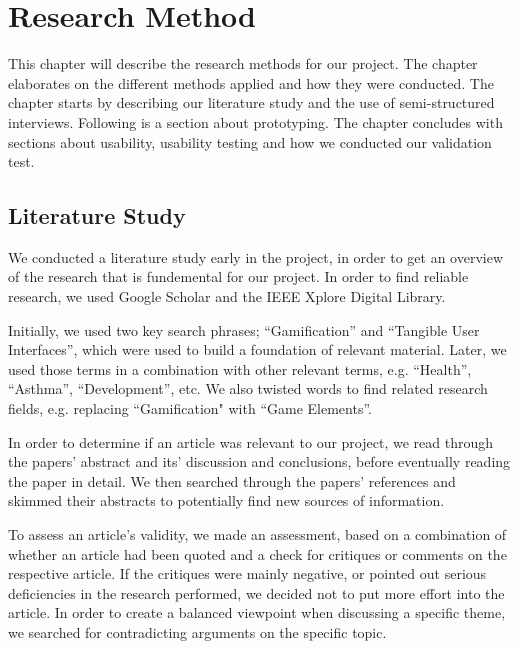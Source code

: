 \chapter{Research Method}
\label{chp:researchmethod}

This chapter will describe the research methods for our project. The chapter elaborates on the different methods applied and how they were conducted. The chapter starts by describing our literature study and the use of semi-structured interviews. Following is a section about prototyping. The chapter concludes with sections about usability, usability testing and how we conducted our validation test.

\section{Literature Study}
\label{sec:literaturestudy}

We conducted a literature study early in the project, in order to get an overview of the research that is fundemental for our project. In order to find reliable research, we used Google Scholar and the IEEE Xplore Digital Library. 

Initially, we used two key search phrases; ``Gamification'' and ``Tangible User Interfaces'', which were used to build a foundation of relevant material. Later, we used those terms in a combination with other relevant terms, e.g. ``Health'', ``Asthma'', ``Development'', etc. We also twisted words to find related research fields, e.g. replacing ``Gamification" with ``Game Elements''. 

In order to determine if an article was relevant to our project, we read through the papers' abstract and its' discussion and conclusions, before eventually reading the paper in detail. We then searched through the papers' references and skimmed their abstracts to potentially find new sources of information. 

To assess an article's validity, we made an assessment, based on a combination of whether an article had been quoted and a check for critiques or comments on the respective article. If the critiques were mainly negative, or pointed out serious deficiencies in the research performed, we decided not to put more effort into the article. In order to create a balanced viewpoint when discussing a specific theme, we searched for contradicting arguments on the specific topic.  

